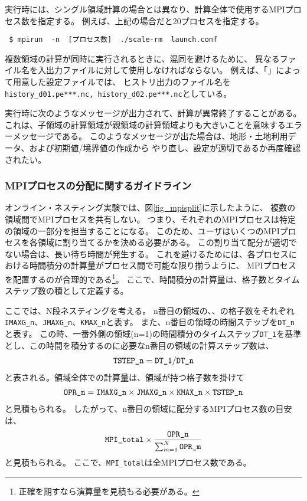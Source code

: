 実行時には、シングル領域計算の場合とは異なり、計算全体で使用するMPIプロセス数を指定する。
例えば、上記の場合だと20プロセスを指定する。
\begin{verbatim}
 $ mpirun  -n  [プロセス数]  ./scale-rm  launch.conf
\end{verbatim}

複数領域の計算が同時に実行されるときに、混同を避けるために、
異なるファイル名を入出力ファイルに対して使用しなければならない。
例えば、「\makeconftool」によって用意した設定ファイルでは、
ヒストリ出力のファイル名を\verb|history_d01.pe***.nc, history_d02.pe***.nc|としている。

実行時に次のようなメッセージが出力されて、計算が異常終了することがある。
これは、子領域の計算領域が親領域の計算領域よりも大きいことを意味するエラーメッセージである。
このようなメッセージが出た場合は、地形・土地利用データ、および初期値/境界値の作成から
やり直し、設定が適切であるか再度確認されたい。

\subsubsection{MPIプロセスの分配に関するガイドライン}
オンライン・ネスティング実験では、図\ref{fig_mpisplit}に示したように、
複数の領域間でMPIプロセスを共有しない。
つまり、それぞれのMPIプロセスは特定の領域の一部分を担当することになる。
このため、ユーザはいくつのMPIプロセスを各領域に割り当てるかを決める必要がある。
この割り当て配分が適切でない場合は、長い待ち時間が発生する。
これを避けるためには、各プロセスにおける時間積分の計算量がプロセス間で可能な限り揃うように、
MPIプロセスを配置するのが合理的である\footnote{正確を期すなら演算量を見積もる必要がある。}。
ここで、時間積分の計算量は、格子数とタイムステップ数の積として定義する。

ここでは、N段ネスティングを考える。
n番目の領域の{\XDIR}、{\YDIR}、{\ZDIR}の格子数をそれぞれ\verb|IMAXG_n|、\verb|JMAXG_n|、\verb|KMAX_n|と表す。
また、n番目の領域の時間ステップを\verb|DT_n|と表す。
この時、一番外側の領域(n=1)の時間積分のタイムステップ\verb|DT_1|を基準とし、この時間を積分するのに必要なn番目の領域の計算ステップ数は、
\begin{eqnarray}
 \verb|TSTEP_n| = \verb|DT_1| / \verb|DT_n|  \nonumber
\end{eqnarray}
と表される。領域全体での計算量は、領域が持つ格子数を掛けて
\begin{eqnarray}
 \verb|OPR_n| = \verb|IMAXG_n| \times \verb|JMAXG_n| \times \verb|KMAX_n| \times \verb|TSTEP_n| \nonumber
\end{eqnarray}
と見積もられる。
したがって、n番目の領域に配分するMPIプロセス数の目安は、
\begin{eqnarray}
 \verb|MPI_total| \times \frac{ \texttt{OPR\_n} }{ \sum_{m=1}^N \texttt{OPR\_m} }
\end{eqnarray}
と見積もられる。
ここで、\verb|MPI_total|は全MPIプロセス数である。


